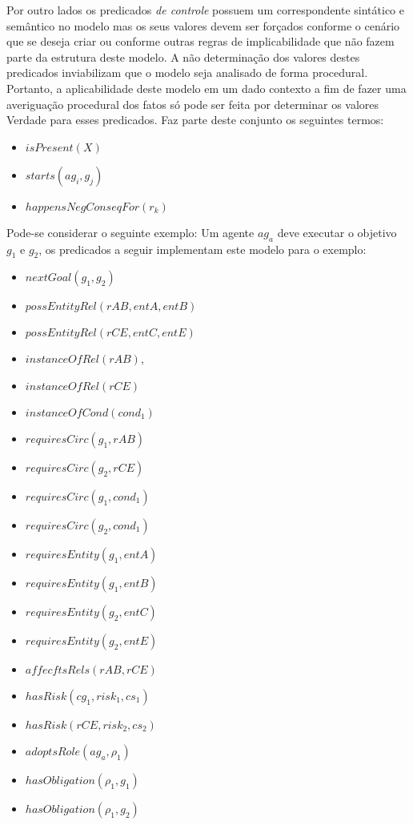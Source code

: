 Por outro lados os predicados \textit{de controle} possuem um correspondente sintático e semântico no modelo mas os seus valores devem ser forçados conforme o cenário que se deseja criar ou conforme outras regras de implicabilidade que não fazem parte da estrutura deste modelo. A não determinação dos valores destes predicados inviabilizam que o modelo seja analisado de forma procedural. Portanto, a aplicabilidade deste modelo em um dado contexto a fim de fazer uma averiguação procedural dos fatos só pode ser feita por determinar os valores Verdade para esses predicados. Faz parte deste conjunto os seguintes termos: 

\begin{itemize}
    \item $isPresent(X)$
    \item $starts(ag_i,g_j)$
    \item $happensNegConseqFor(r_k)$
\end{itemize}

Pode-se considerar o seguinte exemplo: Um agente $ag_a$ deve executar o objetivo $g_1$ e $g_2$, os predicados a seguir implementam este modelo para o exemplo:

\begin{itemize}
    \item $nextGoal(g_1,g_2)$
    \item $possEntityRel(rAB,entA,entB)$
    \item $possEntityRel(rCE,entC,entE)$
    \item $instanceOfRel(rAB)$,
    \item $instanceOfRel(rCE) $
    \item $instanceOfCond(cond_1)$
    \item $requiresCirc(g_1,rAB)$
    \item $requiresCirc(g_2,rCE)$
    \item $requiresCirc(g_1,cond_1)$
    \item $requiresCirc(g_2,cond_1)$    
    \item $requiresEntity(g_1,entA)$
    \item $requiresEntity(g_1,entB)$
    \item $requiresEntity(g_2,entC)$
    \item $requiresEntity(g_2,entE)$            
    \item $affecftsRels(rAB,rCE) $ 
    \item $hasRisk(cg_1,risk_1,cs_1)$
    \item $hasRisk(rCE,risk_2,cs_2)$
    \item $adoptsRole(ag_a,\rho_1)$
    \item $hasObligation(\rho_1,g_1)$
    \item $hasObligation(\rho_1,g_2)$
\end{itemize}

